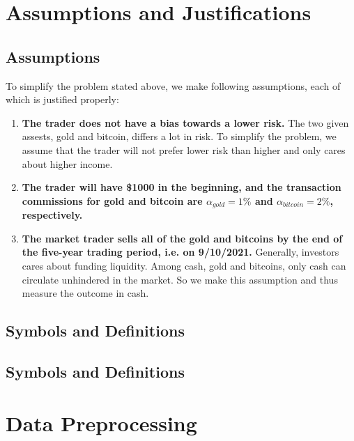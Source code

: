 \documentclass[12pt,a4paper]{article}
\begin{document}
\begin{spacing}{1.2}
\section{Assumptions and Justifications}
\label{Assumptions_Justifications}

\subsection{Assumptions}
To simplify the problem stated above, we make following assumptions, each of which is justified properly: 
\begin{enumerate}
	
	\item \textbf{The trader does not have a bias towards a lower risk.} The two given assests, gold and bitcoin, differs a lot in risk. To simplify the problem, we assume that the trader will not prefer lower risk than higher and only cares about higher income.
	
	\item \textbf{The trader will have \$1000 in the beginning, and the transaction commissions for gold and bitcoin are $\alpha_{gold}=1\%$ and $\alpha_{bitcoin}=2\%$, respectively.}


	\item \textbf{The market trader sells all of the gold and bitcoins by the end of the five-year trading period, i.e. on 9/10/2021.} Generally, investors cares about funding liquidity. Among cash, gold and bitcoins, only cash can circulate unhindered in the market. So we make this assumption and thus measure the outcome in cash.
	
\end{enumerate}


\subsection{Symbols and Definitions}



\subsection{Symbols and Definitions}







\section{Data Preprocessing}
\label{DataPreprocessing}



\end{spacing}
\end{document}
